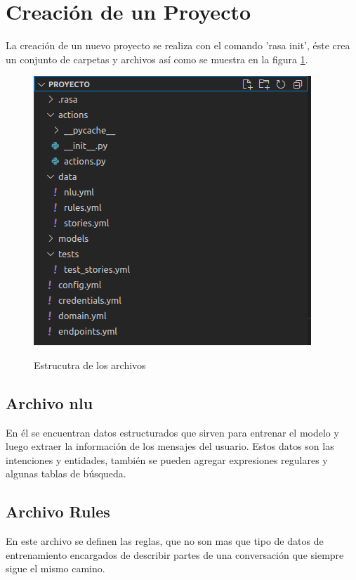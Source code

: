 \section{Creación de un Proyecto}
\indent La creación de un nuevo proyecto se realiza con el comando 'rasa init', éste crea un conjunto de carpetas y archivos así como se muestra en la figura \ref{fig:Estructura}.
\begin{figure}[h]
    \centering
    \includegraphics[width=\textwidth]{imagenes/cap3/4_Estructura del Proyecto.png}
    \caption{Estrucutra de los archivos}
    \label{fig:Estructura}
    \cite{Rasa}
\end{figure}
\subsection{Archivo nlu}
En él se encuentran datos estructurados que sirven para entrenar el modelo y luego extraer la información de los mensajes del usuario. Estos datos son  las intenciones y entidades, también se pueden agregar expresiones regulares y algunas tablas de búsqueda. \cite{NLU_Documentation}

\subsection{Archivo Rules}
En este archivo se definen las reglas, que no son mas que  tipo de datos de entrenamiento encargados de describir partes de una conversación que siempre sigue el mismo camino.\cite{Rules_Documentation}

